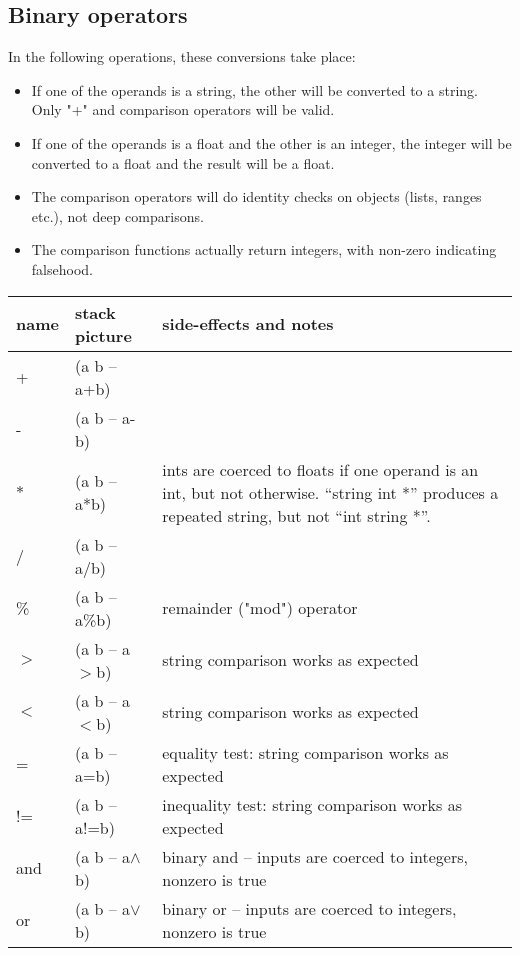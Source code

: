 \subsection{Binary operators}
In the following operations, these conversions take place:
\begin{itemize}
\item If one of the operands is a string, the other will be converted to a string. Only "+" and comparison operators will be valid.
\item If one of the operands is a float and the other is an integer, the integer will be converted to a float and the result will be a float.
\item The comparison operators will do identity checks on objects (lists, ranges etc.), not deep comparisons.
\item The comparison functions actually return integers, with non-zero indicating falsehood.
\end{itemize}
\begin{center}
\begin{tabular}{|l|l|p{4in}|}\hline
\textbf{name} & \textbf{stack picture} & \textbf{side-effects and notes}\\ \hline
+    & (a b -- a+b)&\\
-    & (a b -- a-b)&\\
$*$    & (a b -- a*b)& ints are coerced to floats if one operand is an int, but not otherwise. ``string int *'' produces
a repeated string, but not ``int string *''.\\
/    & (a b -- a/b)&\\
\%    & (a b -- a\%b) & remainder ("mod") operator\\
$>$    & (a b -- a$>$b)& string comparison works as expected\\
$<$    & (a b -- a$<$b)& string comparison works as expected\\
=    & (a b -- a=b)& equality test: string comparison works as expected\\
!=   & (a b -- a!=b)& inequality test: string comparison works as expected\\
and & (a b -- a$\wedge$b) & binary and -- inputs are coerced to integers, nonzero is true\\
or & (a b -- a$\vee$b) & binary or  -- inputs are coerced to integers, nonzero is true\\
\hline
\end{tabular}
\end{center}

